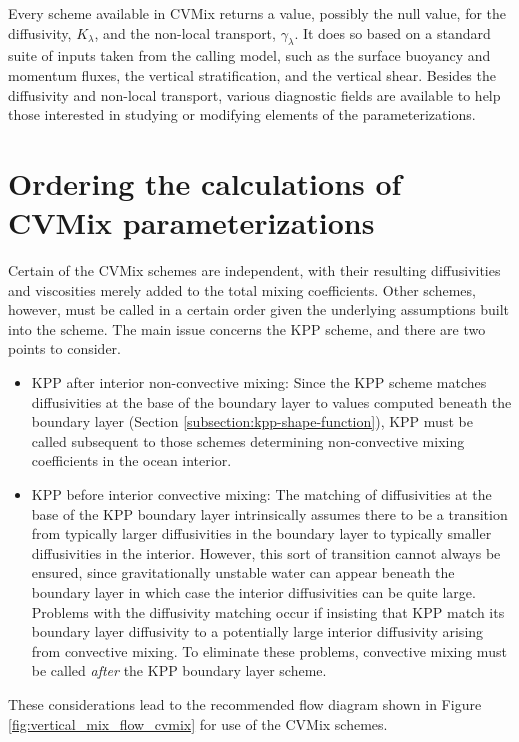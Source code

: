 Every scheme available in CVMix returns a value, possibly the null
value, for the diffusivity, $K_{\lambda}$, and the non-local
transport, $\gamma_{\lambda}$.  It does so based on a standard suite
of inputs taken from the calling model, such as the surface buoyancy
and momentum fluxes, the vertical stratification, and the vertical
shear.  Besides the diffusivity and non-local transport, various
diagnostic fields are available to help those interested in studying
or modifying elements of the parameterizations.



\section{Ordering the calculations of CVMix parameterizations}
\label{section:vert_mix_schemes_ordering_cvmix}

Certain of the CVMix schemes are independent, with their resulting
diffusivities and viscosities merely added to the total mixing
coefficients.  Other schemes, however, must be called in a certain
order given the underlying assumptions built into the scheme.  The
main issue concerns the KPP scheme, and there are two points to
consider. 
\begin{itemize}
\item {\sc KPP after interior non-convective mixing}: Since the KPP
  scheme matches diffusivities at the base of the boundary layer to
  values computed beneath the boundary layer (Section
  \ref{subsection:kpp-shape-function}), KPP must be called subsequent
  to those schemes determining non-convective mixing coefficients in
  the ocean interior.

\item {\sc KPP before interior convective mixing}: The matching of
  diffusivities at the base of the KPP boundary layer intrinsically
  assumes there to be a transition from typically larger diffusivities
  in the boundary layer to typically smaller diffusivities in the
  interior.  However, this sort of transition cannot always be
  ensured, since gravitationally unstable water can appear beneath the
  boundary layer in which case the interior diffusivities can be quite
  large.  Problems with the diffusivity matching occur if insisting
  that KPP match its boundary layer diffusivity to a potentially large
  interior diffusivity arising from convective mixing.  To eliminate
  these problems, convective mixing must be called {\it after} the KPP
  boundary layer scheme.

\end{itemize}
These considerations lead to the recommended flow diagram shown in
Figure \ref{fig:vertical_mix_flow_cvmix} for use of the CVMix
schemes.

